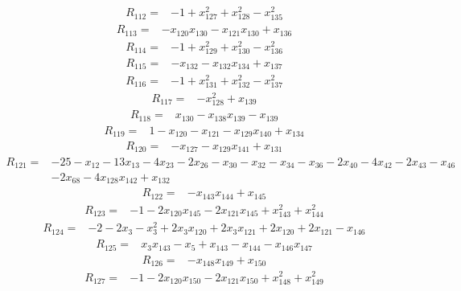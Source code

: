 \[\begin{aligned}R_{112}={}&-1+x_{127}^{2}+x_{128}^{2}-x_{135}^{2}
\end{aligned}\]
\[\begin{aligned}R_{113}={}&-x_{120}x_{130}-x_{121}x_{130}+x_{136}
\end{aligned}\]
\[\begin{aligned}R_{114}={}&-1+x_{129}^{2}+x_{130}^{2}-x_{136}^{2}
\end{aligned}\]
\[\begin{aligned}R_{115}={}&-x_{132}-x_{132}x_{134}+x_{137}
\end{aligned}\]
\[\begin{aligned}R_{116}={}&-1+x_{131}^{2}+x_{132}^{2}-x_{137}^{2}
\end{aligned}\]
\[\begin{aligned}R_{117}={}&-x_{128}^{2}+x_{139}
\end{aligned}\]
\[\begin{aligned}R_{118}={}&x_{130}-x_{138}x_{139}-x_{139}
\end{aligned}\]
\[\begin{aligned}R_{119}={}&1-x_{120}-x_{121}-x_{129}x_{140}+x_{134}
\end{aligned}\]
\[\begin{aligned}R_{120}={}&-x_{127}-x_{129}x_{141}+x_{131}
\end{aligned}\]
\[\begin{aligned}R_{121}={}&-25-x_{12}-13x_{13}-4x_{23}-2x_{26}-x_{30}-x_{32}-x_{34}-x_{36}-2x_{40}-4x_{42}-2x_{43}-x_{46}
\\&-2x_{68}-4x_{128}x_{142}+x_{132}
\end{aligned}\]
\[\begin{aligned}R_{122}={}&-x_{143}x_{144}+x_{145}
\end{aligned}\]
\[\begin{aligned}R_{123}={}&-1-2x_{120}x_{145}-2x_{121}x_{145}+x_{143}^{2}+x_{144}^{2}
\end{aligned}\]
\[\begin{aligned}R_{124}={}&-2-2x_{3}-x_{3}^{2}+2x_{3}x_{120}+2x_{3}x_{121}+2x_{120}+2x_{121}-x_{146}
\end{aligned}\]
\[\begin{aligned}R_{125}={}&x_{3}x_{143}-x_{5}+x_{143}-x_{144}-x_{146}x_{147}
\end{aligned}\]
\[\begin{aligned}R_{126}={}&-x_{148}x_{149}+x_{150}
\end{aligned}\]
\[\begin{aligned}R_{127}={}&-1-2x_{120}x_{150}-2x_{121}x_{150}+x_{148}^{2}+x_{149}^{2}
\end{aligned}\]
